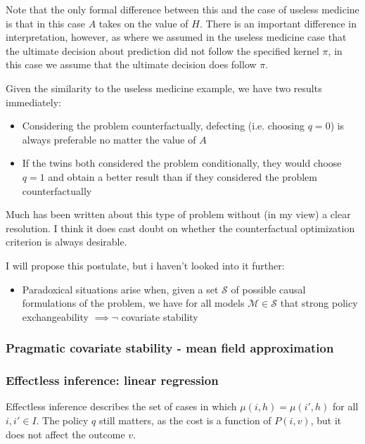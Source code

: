 Note that the only formal difference between this and the case of useless medicine is that in this case $A$ takes on the value of $H$. There is an important difference in interpretation, however, as where we assumed in the useless medicine case that the ultimate decision about prediction did not follow the specified kernel $\pi$, in this case we assume that the ultimate decision does follow $\pi$.

Given the similarity to the useless medicine example, we have two results immediately:
\begin{itemize}
    \item Considering the problem counterfactually, defecting (i.e. choosing $q=0$) is always preferable no matter the value of $A$
    \item If the twins both considered the problem conditionally, they would choose $q=1$ and obtain a better result than if they considered the problem counterfactually
\end{itemize}
Much has been written about this type of problem without (in my view) a clear resolution. I think it does cast doubt on whether the counterfactual optimization criterion is always desirable.

I will propose this postulate, but i haven't looked into it further:
\begin{itemize}
    \item Paradoxical situations arise when, given a set $\mathscr{S}$ of possible causal formulations of the problem, we have for all models $\mathscr{M}\in\mathscr{S}$ that strong policy exchangeability $\implies \neg$ covariate stability
\end{itemize}

\subsubsection{Pragmatic covariate stability - mean field approximation}



\subsubsection{Effectless inference: linear regression}

Effectless inference describes the set of cases in which $\mu(i,h)=\mu(i',h)$ for all $i,i'\in I$. The policy $q$ still matters, as the cost is a function of $P(i,v)$, but it does not affect the outcome $v$.

\begin{center}
\end{center}


